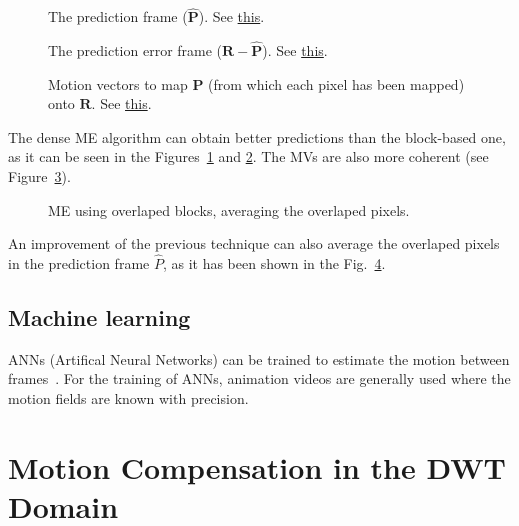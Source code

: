 \begin{figure}
  \centering
  \caption{The prediction frame (${\hat{\mathbf P}}$). See \href{https://github.com/Sistemas-Multimedia/Sistemas-Multimedia.github.io/blob/master/milestones/09-ME/full_search_dense_ME.ipynb}{this}.}
  \label{fig:hat_P_dense}
\end{figure}

\begin{figure}
  \centering
  \caption{The prediction error frame (${\mathbf R} - {\hat{\mathbf P}}$). See \href{https://github.com/Sistemas-Multimedia/Sistemas-Multimedia.github.io/blob/master/milestones/09-ME/full_search_dense_ME.ipynb}{this}.}
  \label{fig:error_dense}
\end{figure}

\begin{figure}
  \centering
  \caption{Motion vectors to map ${\mathbf P}$ (from which each pixel has been mapped) onto ${\mathbf R}$. See \href{https://github.com/Sistemas-Multimedia/Sistemas-Multimedia.github.io/blob/master/milestones/09-ME/full_search_dense_ME.ipynb}{this}.}
  \label{fig:MVs_dense}
\end{figure}

The dense ME algorithm can obtain better predictions than the
block-based one, as it can be seen in the
Figures~\ref{fig:hat_P_dense} and \ref{fig:error_dense}. The MVs are
also more coherent (see Figure~\ref{fig:MVs_dense}).

\begin{figure}
  \centering
  \caption{ME using overlaped blocks, averaging the overlaped pixels.}
  \label{fig:average}
\end{figure}

An improvement of the previous technique can also average the
overlaped pixels in the prediction frame $\hat{P}$, as it has been
shown in the Fig.~\ref{fig:average}.

\subsection{Machine learning}
ANNs (Artifical Neural Networks) can be trained to estimate the motion
between frames~\cite{dosovitskiy2015flownet}. For the training of
ANNs, animation videos are generally used where the motion fields are
known with precision.

\section{Motion Compensation in the DWT Domain}

